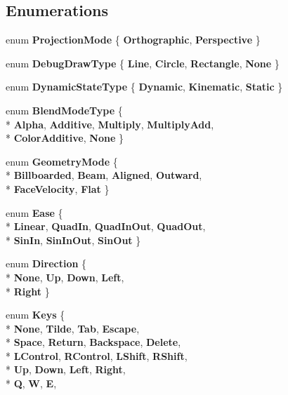 \subsection*{Enumerations}
\begin{DoxyCompactItemize}
\item 
enum {\bfseries Projection\-Mode} \{ {\bfseries Orthographic}, 
{\bfseries Perspective}
 \}
\item 
enum {\bfseries Debug\-Draw\-Type} \{ {\bfseries Line}, 
{\bfseries Circle}, 
{\bfseries Rectangle}, 
{\bfseries None}
 \}
\item 
enum {\bfseries Dynamic\-State\-Type} \{ {\bfseries Dynamic}, 
{\bfseries Kinematic}, 
{\bfseries Static}
 \}
\item 
enum {\bfseries Blend\-Mode\-Type} \{ \\*
{\bfseries Alpha}, 
{\bfseries Additive}, 
{\bfseries Multiply}, 
{\bfseries Multiply\-Add}, 
\\*
{\bfseries Color\-Additive}, 
{\bfseries None}
 \}
\item 
enum {\bfseries Geometry\-Mode} \{ \\*
{\bfseries Billboarded}, 
{\bfseries Beam}, 
{\bfseries Aligned}, 
{\bfseries Outward}, 
\\*
{\bfseries Face\-Velocity}, 
{\bfseries Flat}
 \}
\item 
enum {\bfseries Ease} \{ \\*
{\bfseries Linear}, 
{\bfseries Quad\-In}, 
{\bfseries Quad\-In\-Out}, 
{\bfseries Quad\-Out}, 
\\*
{\bfseries Sin\-In}, 
{\bfseries Sin\-In\-Out}, 
{\bfseries Sin\-Out}
 \}
\item 
enum {\bfseries Direction} \{ \\*
{\bfseries None}, 
{\bfseries Up}, 
{\bfseries Down}, 
{\bfseries Left}, 
\\*
{\bfseries Right}
 \}
\item 
enum {\bfseries Keys} \{ \\*
{\bfseries None}, 
{\bfseries Tilde}, 
{\bfseries Tab}, 
{\bfseries Escape}, 
\\*
{\bfseries Space}, 
{\bfseries Return}, 
{\bfseries Backspace}, 
{\bfseries Delete}, 
\\*
{\bfseries L\-Control}, 
{\bfseries R\-Control}, 
{\bfseries L\-Shift}, 
{\bfseries R\-Shift}, 
\\*
{\bfseries Up}, 
{\bfseries Down}, 
{\bfseries Left}, 
{\bfseries Right}, 
\\*
{\bfseries Q}, 
{\bfseries W}, 
{\bfseries E}, 

\end{DoxyCompactItemize}
